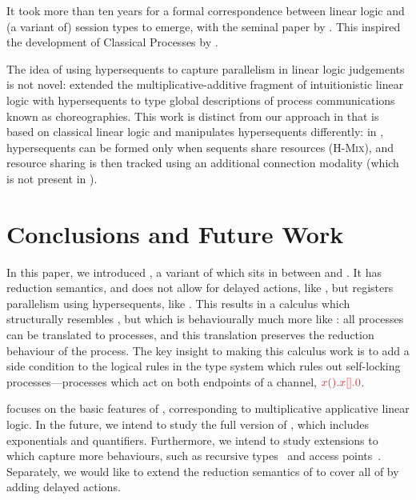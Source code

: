 \documentclass[submission,copyright,creativecommons]{eptcs}
\begin{document}
It took more than ten years for a formal correspondence between linear logic and (a variant of) session types to emerge, with the seminal paper by \citet{caires2010}. This inspired the development of Classical Processes by \citet{wadler2012}.

The idea of using hypersequents to capture parallelism in linear logic judgements is not novel: \citet{carbone2018} extended the multiplicative-additive fragment of intuitionistic linear logic with hypersequents to type global descriptions of process communications known as choreographies. This work is distinct from our approach in that \hcp is based on classical linear logic and manipulates hypersequents differently: in \citet{carbone2018}, hypersequents can be formed only when sequents share resources (\cf \textsc{H-Mix}), and resource sharing is then tracked using an additional connection modality (which is not present in \hcp).

\section{Conclusions and Future Work}
\label{sec:conclusion}
In this paper, we introduced \hcp, a variant of \dhcp which sits in between \cp and \dhcp. It has reduction semantics, and does not allow for delayed actions, like \cp, but registers parallelism using hypersequents, like \dhcp. This results in a calculus which structurally resembles \dhcp, but which is behaviourally much more like \cp: all \cp processes can be translated to \hcp processes, and this translation preserves the reduction behaviour of the process. The key insight to making this calculus work is to add a side condition to the logical rules in the type system which rules out self-locking processes---processes which act on both endpoints of a channel, \eg $\tm{\piRecv{x}{}{\piBoundSend{x}{}{\piHalt}}}$.

\hcp focuses on the basic features of \cp, corresponding to multiplicative applicative linear logic. In the future, we intend to study the full version of \hcp, which includes exponentials and quantifiers. Furthermore, we intend to study extensions to \hcp which capture more behaviours, such as recursive types~\citep{lindley2016} and access points~\citep{gay2009}. Separately, we would like to extend the reduction semantics of \hcp to cover all of \dhcp by adding delayed actions.

\clearpage


\end{document}
